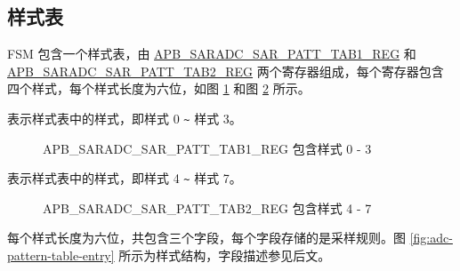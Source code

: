 \documentclass[main\_\_CN.tex]{subfiles}
\begin{document}
\subsection{样式表}\label{sec:adc_pattern}

FSM 包含一个样式表，由 \hyperref[regdesc:APBSARADCSARPATTTAB1REG]{APB\_SARADC\_SAR\_PATT\_TAB1\_REG} 和 \hyperref[regdesc:APBSARADCSARPATTTAB1REG]{APB\_SARADC\_SAR\_PATT\_TAB2\_REG} 两个寄存器组成，每个寄存器包含四个样式，每个样式长度为六位，如图 \ref{fig:adc-apb-saradc-sar-patt-tab1-reg-pattern-tab-entry0-entry3} 和图 \ref{fig:adc-apb-saradc-sar-patt-tab2-reg-pattern-tab-entry4-entry7} 所示。

%
%
%
%
%
\begin{regdesc}\begin{reglist}
\item [cmd \regindex{x}] 表示样式表中的样式，即样式 0 \verb+~+ 样式 3。
\end{reglist}\end{regdesc}
\vspace{-2em}
\begin{figure}[H]
    \centering
    \caption{APB\_SARADC\_SAR\_PATT\_TAB1\_REG 包含样式 0 - 3}
    \label{fig:adc-apb-saradc-sar-patt-tab1-reg-pattern-tab-entry0-entry3}
\end{figure}

%
%
%
%
%
\begin{regdesc}\begin{reglist}
\item [cmd \regindex{x}] 表示样式表中的样式，即样式 4 \verb+~+ 样式 7。
\end{reglist}\end{regdesc}
\vspace{-2em}
\begin{figure}[H]
    \centering
    \caption{APB\_SARADC\_SAR\_PATT\_TAB2\_REG 包含样式 4 - 7}
    \label{fig:adc-apb-saradc-sar-patt-tab2-reg-pattern-tab-entry4-entry7}
\end{figure}

每个样式长度为六位，共包含三个字段，每个字段存储的是采样规则。图 \ref{fig:adc-pattern-table-entry} 所示为样式结构，字段描述参见后文。
\end{document}
